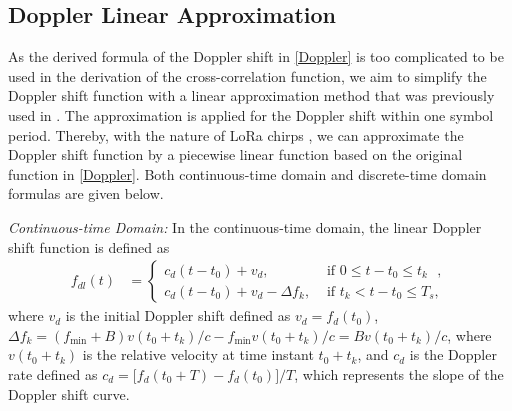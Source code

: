 \documentclass{IEEEtaes}
\theoremstyle{plain}
\begin{document}
\subsection{Doppler Linear Approximation} \label{Doppler_linear_approximation}
As the derived formula of the Doppler shift in \eqref{Doppler} is too complicated to be used in the derivation of the cross-correlation function, we aim to simplify the Doppler shift function with a linear approximation method that was previously used in \cite{ben2022new,cao2021influence}. 
The approximation is applied for the Doppler shift within one symbol period. Thereby, with the nature of LoRa chirps \cite{benkhelifa2022orthogonal}, we can approximate the Doppler shift function by a piecewise linear function based on the original function in \eqref{Doppler}. Both continuous-time domain and discrete-time domain formulas are given below.

\textit{Continuous-time Domain:}
In the continuous-time domain, the linear Doppler shift function is defined as
\begin{equation}
  \label{approximation-con}
  \begin{aligned} 
    f_{dl}(t)  & =\begin{cases}
      c_d (t-t_0)+ v_d, &\text{ if $0\le t-t_0 \le t_k$ },\\
      c_d (t-t_0)+ v_d -\Delta f_k, & \text{ if $t_k < t-t_0 \le T_s$},
    \end{cases}
  \end{aligned}
\end{equation}
where $v_d$ is the initial Doppler shift defined as $v_d = f_d(t_0)$, $\Delta f_k = (f_{\min}+B)v(t_0+t_k)/c - f_{\min}v(t_0+t_k)/c = Bv(t_0+t_k)/c$, where $v(t_0+t_k)$ is the relative velocity at time instant $t_0+t_k$, and $c_d$ is the Doppler rate defined as $c_d = \big[f_d(t_0+T)-f_d(t_0)\big]/T$, which represents the slope of the Doppler shift curve.
\end{document}

